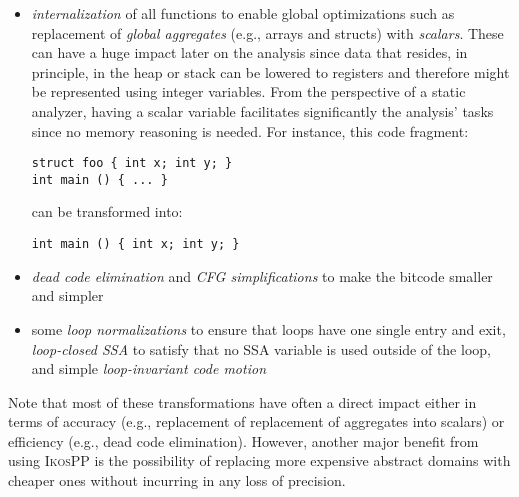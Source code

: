 \documentclass[a4]{article}
\newcommand{\ikospp}{\textsc{IkosPP}\xspace}
\begin{document}
\begin{itemize}

\item \emph{internalization} of all functions to enable global
  optimizations such as replacement of \emph{global aggregates} (e.g.,
  arrays and structs) with \emph{scalars}. These can have a huge
  impact later on the analysis since data that resides, in principle,
  in the heap or stack can be lowered to registers and therefore might
  be represented using integer variables. From the perspective of a
  static analyzer, having a scalar variable facilitates significantly
  the analysis' tasks since no memory reasoning is needed. For
  instance, this code fragment: 

\begin{small}
\begin{verbatim}
struct foo { int x; int y; }
int main () { ... }
\end{verbatim}
\end{small}

\noindent can be transformed into:

\begin{small}
\begin{verbatim}
int main () { int x; int y; }
\end{verbatim}
\end{small}

\item \emph{dead code elimination} and \emph{CFG simplifications} to
  make the bitcode smaller and simpler

\item some \emph{loop normalizations} to ensure that loops have one
  single entry and exit, \emph{loop-closed SSA} to satisfy that no SSA
  variable is used outside of the loop, and simple
  \emph{loop-invariant code motion}

\end{itemize}

Note that most of these transformations have often a direct impact
either in terms of accuracy (e.g., replacement of replacement of
aggregates into scalars) or efficiency (e.g., dead code
elimination). However, another major benefit from using \ikospp is the
possibility of replacing more expensive abstract domains with cheaper
ones without incurring in any loss of precision.
 
\end{document}
